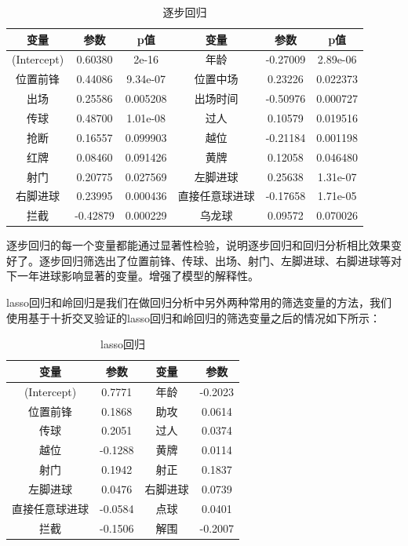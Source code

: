 \documentclass[12pt,a4paper,onecolumn]{article}
\begin{document}
\begin{table}[H]
\centering
\caption{逐步回归}
\begin{tabular}{cccccc}
  \hline
	变量 &参数 &p值 &变量 &参数 &p值 \\\hline
	(Intercept) & 0.60380 & 2e-16 & 年龄 &  -0.27009 & 2.89e-06\\
	位置前锋 &  0.44086 & 9.34e-07 & 位置中场 & 0.23226 & 0.022373\\
 出场 & 0.25586 & 0.005208 & 出场时间 &  -0.50976 & 0.000727\\
 传球 & 0.48700 & 1.01e-08 & 过人 & 0.10579 & 0.019516\\
 抢断 &  0.16557 & 0.099903 & 越位 &-0.21184 & 0.001198\\
 红牌 & 0.08460 & 0.091426 & 黄牌 & 0.12058  & 0.046480\\
 射门 & 0.20775 & 0.027569 & 左脚进球 & 0.25638 & 1.31e-07\\
 右脚进球 & 0.23995 & 0.000436 & 直接任意球进球 &-0.17658  & 1.71e-05\\
 拦截 & -0.42879 & 0.000229 & 乌龙球 & 0.09572 & 0.070026\\
  \hline
  \end{tabular}
\end{table}

逐步回归的每一个变量都能通过显著性检验，说明逐步回归和回归分析相比效果变好了。逐步回归筛选出了位置前锋、传球、出场、射门、左脚进球、右脚进球等对下一年进球影响显著的变量。增强了模型的解释性。

lasso回归和岭回归是我们在做回归分析中另外两种常用的筛选变量的方法，我们使用基于十折交叉验证的lasso回归和岭回归的筛选变量之后的情况如下所示：

\begin{table}[H]
\centering
\caption{lasso回归}
\begin{tabular}{cccc}
  \hline
	变量 &参数 &变量 &参数 \\\hline
	(Intercept)&     0.7771 & 年龄  &         -0.2023\\
 位置前锋  &      0.1868 & 助攻        &    0.0614\\
 传球     &       0.2051 & 过人   &         0.0374\\
 越位      &     -0.1288 & 黄牌    &        0.0114\\
 射门       &     0.1942 & 射正     &       0.1837\\
 左脚进球      &  0.0476 & 右脚进球      &  0.0739\\
 直接任意球进球 & -0.0584 & 点球      &      0.0401\\
 拦截      &     -0.1506 & 解围   &        -0.2007\\
   \hline
  \end{tabular}
\end{table}
\end{document}
